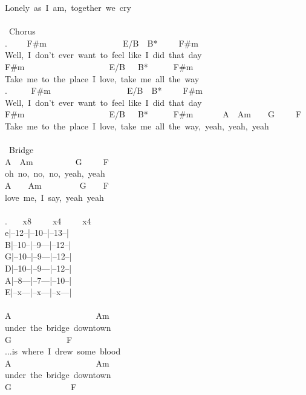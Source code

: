 {Lonely\ as\ I\ am,\ together\ we\ cry\\
\\
\lbrack\ Chorus\rbrack\\
. \ \ \ \ F\#m\ \ \ \ \ \ \ \ \ \ \ \ \ \ \ \ \ \ E/B\ \ B*\ \ \ \ \ F\#m\\
Well,\ I\ don't\ ever\ want\ to\ feel\ like\ I\ did\ that\ day\\
F\#m\ \ \ \ \ \ \ \ \ \ \ \ \ \ \ \ \ \ \ \ E/B\ \ \ B*\ \ \ \ \ \ F\#m\\
Take\ me\ to\ the\ place\ I\ love,\ take\ me\ all\ the\ way\\
. \ \ \ \ \ F\#m\ \ \ \ \ \ \ \ \ \ \ \ \ \ \ \ \ \ E/B\ \ B*\ \ \ \ \ F\#m\\
Well,\ I\ don't\ ever\ want\ to\ feel\ like\ I\ did\ that\ day\\
F\#m\ \ \ \ \ \ \ \ \ \ \ \ \ \ \ \ \ \ \ \ E/B\ \ \ B*\ \ \ \ \ \ F\#m\ \ \ \ \ \ \ A\ \ Am\ \ \ \ G\ \ \ \ \ F\\
Take\ me\ to\ the\ place\ I\ love,\ take\ me\ all\ the\ way,\ yeah,\ yeah,\ yeah\\
\\
\lbrack\ Bridge\rbrack\\
A\ \ Am\ \ \ \ \ \ \ \ \ \ G\ \ \ \ \ F\\
oh\ no,\ no,\ no,\ yeah,\ yeah\\
A\ \ \ \ Am\ \ \ \ \ \ \ \ \ G\ \ \ \ F\\
love\ me,\ I\ say,\ yeah\ yeah\\
\\
. \ \ \ x8\ \ \ \ \ x4\ \ \ \ \ x4\\
e|--12--|--10--|--13--|\\
B|--10--|--9---|--12--|\\
G|--10--|--9---|--12--|\\
D|--10--|--9---|--12--|\\
A|--8---|--7---|--10--|\\
E|--x---|--x---|--x---|\\
\\
A\ \ \ \ \ \ \ \ \ \ \ \ \ \ \ \ \ \ \ \ Am\\
under\ the\ bridge\ downtown\\
G\ \ \ \ \ \ \ \ \ \ \ \ \ F\\
...is\ where\ I\ drew\ some\ blood\\
A\ \ \ \ \ \ \ \ \ \ \ \ \ \ \ \ \ \ \ \ Am\\
under\ the\ bridge\ downtown\\
G\ \ \ \ \ \ \ \ \ \ \ \ \ \ F\\
}
